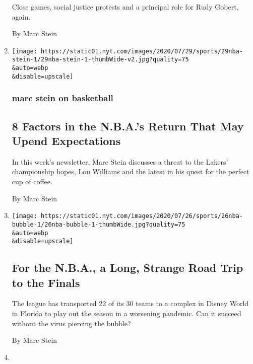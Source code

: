 \begin{enumerate}
  Close games, social justice protests and a principal role for Rudy
  Gobert, again.

  By Marc Stein
\item
  \href{/2020/07/29/sports/basketball/nba-restart-lou-williams.html}{}

  \texttt{[image: https://static01.nyt.com/images/2020/07/29/sports/29nba-stein-1/29nba-stein-1-thumbWide-v2.jpg?quality=75\\\&auto=webp\\\&disable=upscale]}

  \hypertarget{marc-stein-on-basketball}{%
  \subsubsection{marc stein on
  basketball}\label{marc-stein-on-basketball}}

  \hypertarget{8-factors-in-the-nbas-return-that-may-upend-expectations}{%
  \subsection{8 Factors in the N.B.A.'s Return That May Upend
  Expectations}\label{8-factors-in-the-nbas-return-that-may-upend-expectations}}

  In this week's newsletter, Marc Stein discusses a threat to the
  Lakers' championship hopes, Lou Williams and the latest in his quest
  for the perfect cup of coffee.

  By Marc Stein
\item
  \href{/2020/07/27/sports/basketball/coronavirus-nba-season-bubble-disney-world.html}{}

  \texttt{[image: https://static01.nyt.com/images/2020/07/26/sports/26nba-bubble-1/26nba-bubble-1-thumbWide.jpg?quality=75\\\&auto=webp\\\&disable=upscale]}

  \hypertarget{for-the-nba-a-long-strange-road-trip-to-the-finals}{%
  \subsection{For the N.B.A., a Long, Strange Road Trip to the
  Finals}\label{for-the-nba-a-long-strange-road-trip-to-the-finals}}

  The league has transported 22 of its 30 teams to a complex in Disney
  World in Florida to play out the season in a worsening pandemic. Can
  it succeed without the virus piercing the bubble?

  By Marc Stein
\item
  \href{/2020/07/22/sports/basketball/nba-restart-disney-world.html}{}


\end{enumerate}
